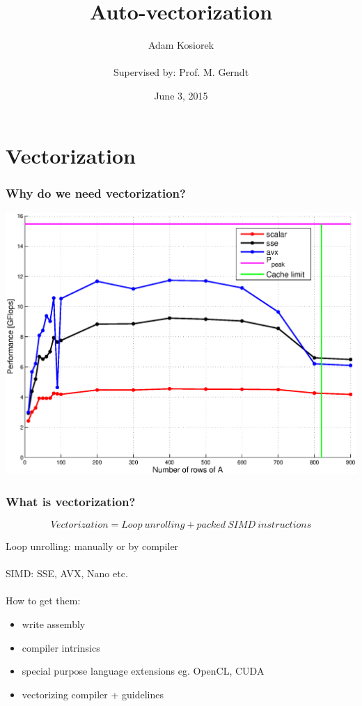 \documentclass{beamer}
\title{Auto-vectorization}
\author[Adam Kosiorek]{Adam Kosiorek\\ \\{\tiny Supervised by: Prof. M. Gerndt}}
\date {June 3, 2015}
\begin{document}
\frame{\titlepage}


\section{Vectorization}

\begin{frame}[fragile]
  \frametitle{Why do we need vectorization?}
   \hspace*{-1.25cm}
   \includegraphics[width=1.2\textwidth]{data/untitled}
\end{frame}

\begin{frame}[fragile]
  \frametitle{What is vectorization?}

  \begin{equation}
    Vectorization = {Loop\ unrolling} + {packed\ SIMD\ instructions}  
  \end{equation}
  
  Loop unrolling: manually or by compiler \\\ \\
  SIMD: SSE, AVX, Nano etc. \\\ \\
  How to get them:
  \begin{itemize}
   \item write assembly
   \item compiler intrinsics
   \item special purpose language extensions eg. OpenCL, CUDA
   \item vectorizing compiler + guidelines
  \end{itemize}
\end{frame}
\end{document}
